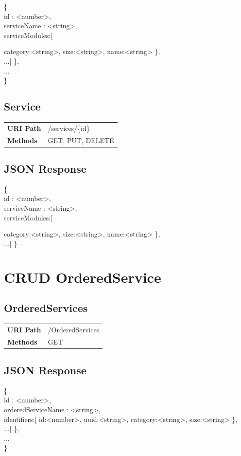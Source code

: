 \documentclass[11pt]{scrartcl}
\begin{document}
\{\\
id : <number>,\\
serviceName : <string>,\\
serviceModules:[{
category:<string>,
size:<string>,
name:<string>
\}, \\ 
...]
\},\\
...\\
\}\\

\subsection{Service}


\begin{tabularx}{\linewidth}{l l}
\textbf{URI Path} & /services/\{id\}\\
\textbf{Methods} & GET, PUT, DELETE\\
\end{tabularx}

\subsection{JSON Response}
\{\\
id : <number>,\\
serviceName : <string>,\\
serviceModules:[{
category:<string>,
size:<string>,
name:<string>
\}, \\ 
...]
\}

\section{CRUD OrderedService}
\subsection{OrderedServices}
\begin{tabularx}{\linewidth}{l l}
\textbf{URI Path} & /OrderedServices\\
\textbf{Methods} & GET\\
\end{tabularx}

\subsection{JSON Response}
\{\\
id : <number>,\\
orderedServiceName : <string>,\\
identifiers:[{
id:<number>,
uuid:<string>,
category:<string>,
size:<string>
\}, \\ 
...]
\},\\
...\\
\}\\


}}}
\end{document}
